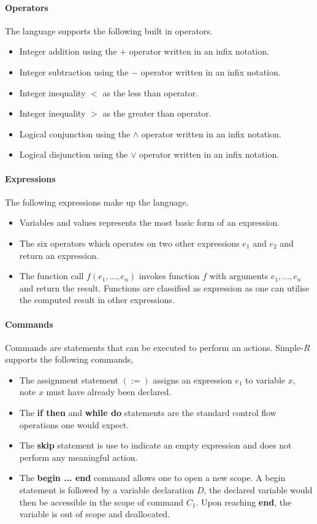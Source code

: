 \documentclass[a4paper,12pt]{report}
\begin{document}
\paragraph{Operators}
The language supports the following built in operators.
\begin{itemize}
  \item Integer addition using the $+$ operator written in an infix notation.
  \item Integer subtraction using the $-$ operator written in an infix notation.
  \item Integer inequality $<$ as the less than operator.
  \item Integer inequality $>$ as the greater than operator.
  \item Logical conjunction using the $\wedge$ operator written in an infix 
  notation.
  \item Logical disjunction using the $\vee$ operator written in an infix 
  notation.
\end{itemize}

\paragraph{Expressions} The following expressions make up the language.
\begin{itemize}
  \item Variables and values represents the most basic form of an expression.
  \item The six operators which operates on two other expressions $e_1$ 
  and $e_2$ and return an expression.
  \item The function call $f(e_1,...,e_n)$ invokes function $f$ with arguments 
  $e_1,...,e_n$ and return the result. Functions are classified as expression as 
  one can utilise the computed result in other expressions. 
\end{itemize}

\paragraph{Commands} Commands are statements that can be executed to perform an 
actions. Simple-$R$ supports the following commands,
\begin{itemize}
  \item The assignment statement $(:=)$ assigns an expression $e_1$ to variable 
  $x$, note $x$ must have already been declared. 
  \item The \textbf{if then} and \textbf{while do} statements are the standard 
  control flow operations one would expect.
  \item The \textbf{skip} statement is use to indicate an empty expression and 
  does not perform any meaningful action. 
  \item The \textbf{begin ... end} command allows one to open a new scope. A 
  begin statement is followed by a variable declaration $D$, the declared 
  variable would then be accessible in the scope of command $C_1$. Upon reaching 
  \textbf{end}, the variable is out of scope and deallocated. 
\end{itemize}
\end{document}
